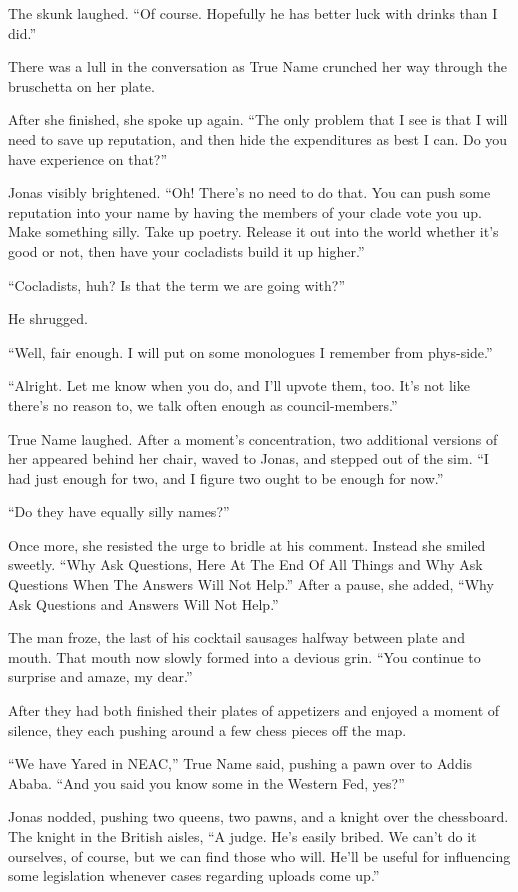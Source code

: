 The skunk laughed. ``Of course. Hopefully he has better luck with drinks than I did.''

There was a lull in the conversation as True Name crunched her way through the bruschetta on her plate.

After she finished, she spoke up again. ``The only problem that I see is that I will need to save up reputation, and then hide the expenditures as best I can. Do you have experience on that?''

Jonas visibly brightened. ``Oh! There's no need to do that. You can push some reputation into your name by having the members of your clade vote you up. Make something silly. Take up poetry. Release it out into the world whether it's good or not, then have your cocladists build it up higher.''

``Cocladists, huh? Is that the term we are going with?''

He shrugged.

``Well, fair enough. I will put on some monologues I remember from phys-side.''

``Alright. Let me know when you do, and I'll upvote them, too. It's not like there's no reason to, we talk often enough as council-members.''

True Name laughed. After a moment's concentration, two additional versions of her appeared behind her chair, waved to Jonas, and stepped out of the sim. ``I had just enough for two, and I figure two ought to be enough for now.''

``Do they have equally silly names?''

Once more, she resisted the urge to bridle at his comment. Instead she smiled sweetly. ``Why Ask Questions, Here At The End Of All Things and Why Ask Questions When The Answers Will Not Help.'' After a pause, she added, ``Why Ask Questions and Answers Will Not Help.''

The man froze, the last of his cocktail sausages halfway between plate and mouth. That mouth now slowly formed into a devious grin. ``You continue to surprise and amaze, my dear.''

After they had both finished their plates of appetizers and enjoyed a moment of silence, they each pushing around a few chess pieces off the map.

``We have Yared in NEAC,'' True Name said, pushing a pawn over to Addis Ababa. ``And you said you know some in the Western Fed, yes?''

Jonas nodded, pushing two queens, two pawns, and a knight over the chessboard. The knight in the British aisles, ``A judge. He's easily bribed. We can't do it ourselves, of course, but we can find those who will. He'll be useful for influencing some legislation whenever cases regarding uploads come up.''

